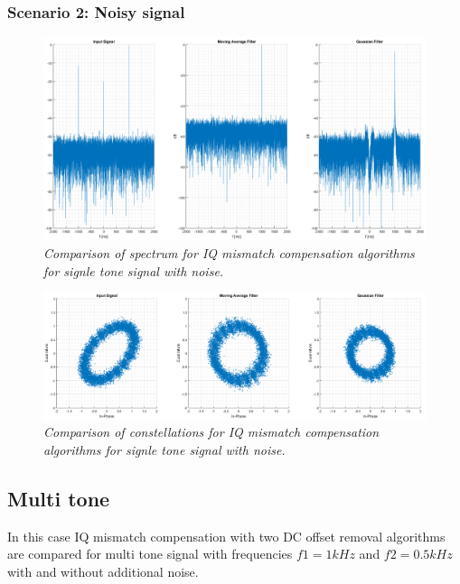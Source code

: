 \documentclass[en,printmode]{mgr}
\begin{document}
		\subsubsection*{Scenario 2: Noisy signal}
			\vspace{1cm}
			\begin{figure}[H]
    			\centering
   				\includegraphics[width=\textwidth]{plots/single_nf.png}
   		 		\caption{\textit{Comparison of spectrum for IQ mismatch compensation algorithms 
   		 		for signle tone signal with noise.}}
   		 	\end{figure}	
   		 	\vspace{2cm}
   		 	\begin{figure}[H]
    			\centering
   				\includegraphics[width=\textwidth]{plots/single_nc.png}
   		 		\caption{\textit{Comparison of constellations for IQ mismatch compensation algorithms 
   		 		for signle tone signal with noise.}}
   		 	\end{figure}
   		 	
   	\newpage
   	\subsection*{Multi tone}
   		In this case IQ mismatch compensation with two DC offset removal algorithms are compared for
		multi tone signal with frequencies $f1=1kHz$ and $f2=0.5kHz$ with and without additional noise.
\end{document}
